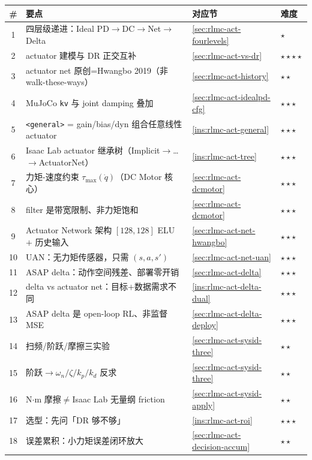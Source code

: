 \begin{center}
\small
\begin{tabular}{@{}clll@{}}
\toprule
\# & 要点 & 对应节 & 难度 \\
\midrule
1 & 四层级递进：Ideal PD$\to$DC$\to$Net$\to$Delta & \cref{sec:rlmc-act-fourlevels} & $\star$ \\
2 & actuator 建模与 DR 正交互补 & \cref{sec:rlmc-act-vs-dr} & $\star\star\star\star$ \\
3 & actuator net 原创=Hwangbo 2019（非 walk-these-ways） & \cref{sec:rlmc-act-history} & $\star\star$ \\
4 & MuJoCo \verb|kv| 与 joint damping 叠加 & \cref{sec:rlmc-act-idealpd-cfg} & $\star\star\star$ \\
5 & \verb|<general>| = gain/bias/dyn 组合任意线性 actuator & \cref{ins:rlmc-act-general} & $\star\star\star$ \\
6 & Isaac Lab actuator 继承树（Implicit$\to$…$\to$ActuatorNet） & \cref{ins:rlmc-act-tree} & $\star\star\star$ \\
7 & 力矩-速度约束 $\tau_{\max}(\dot q)$（DC Motor 核心） & \cref{sec:rlmc-act-dcmotor} & $\star\star\star$ \\
8 & filter 是带宽限制、非力矩饱和 & \cref{sec:rlmc-act-dcmotor} & $\star\star\star$ \\
9 & Actuator Network 架构 $[128,128]$ ELU $+$ 历史输入 & \cref{sec:rlmc-act-net-hwangbo} & $\star\star\star$ \\
10 & UAN：无力矩传感器，只需 $(s,a,s')$ & \cref{sec:rlmc-act-net-uan} & $\star\star\star$ \\
11 & ASAP delta：动作空间残差、部署零开销 & \cref{sec:rlmc-act-delta} & $\star\star\star$ \\
12 & delta vs actuator net：目标$+$数据需求不同 & \cref{ins:rlmc-act-delta-dual} & $\star\star\star$ \\
13 & ASAP delta 是 open-loop RL、非监督 MSE & \cref{sec:rlmc-act-delta-deploy} & $\star\star\star$ \\
14 & 扫频/阶跃/摩擦三实验 & \cref{sec:rlmc-act-sysid-three} & $\star\star$ \\
15 & 阶跃$\to\omega_n/\zeta/k_p/k_d$ 反求 & \cref{sec:rlmc-act-sysid-three} & $\star\star$ \\
16 & N$\cdot$m 摩擦$\neq$Isaac Lab 无量纲 friction & \cref{sec:rlmc-act-sysid-apply} & $\star\star$ \\
17 & 选型：先问「DR 够不够」 & \cref{ins:rlmc-act-roi} & $\star\star\star$ \\
18 & 误差累积：小力矩误差闭环放大 & \cref{sec:rlmc-act-decision-accum} & $\star\star$ \\
\bottomrule
\end{tabular}
\end{center}

